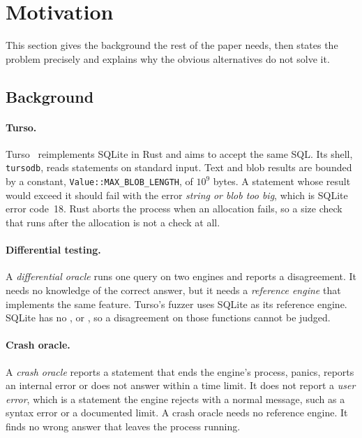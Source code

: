 \section{Motivation}
\label{sec:motivation}

This section gives the background the rest of the paper needs, then states the
problem precisely and explains why the obvious alternatives do not solve it.

\subsection{Background}
\label{sec:background}

\paragraph{Turso.} Turso~\cite{turso} reimplements SQLite in Rust and aims to
accept the same SQL. Its shell, \texttt{tursodb}, reads statements on standard
input. Text and blob results are bounded by a constant,
\texttt{Value::MAX\_BLOB\_LENGTH}, of $10^9$ bytes. A statement whose result
would exceed it should fail with the error \emph{string or blob too big}, which
is SQLite error code~18. Rust aborts the process when an allocation fails, so a
size check that runs after the allocation is not a check at all.

\paragraph{Differential testing.} A \emph{differential oracle} runs one query on
two engines and reports a disagreement. It needs no knowledge of the correct
answer, but it needs a \emph{reference engine} that implements the same feature.
Turso's fuzzer uses SQLite as its reference engine. SQLite has no ,
 or , so a disagreement on those functions cannot be
judged.

\paragraph{Crash oracle.} A \emph{crash oracle} reports a statement that ends the
engine's process, panics, reports an internal error or does not answer within a
time limit. It does not report a \emph{user error}, which is a statement the
engine rejects with a normal message, such as a syntax error or a documented
limit. A crash oracle needs no reference engine. It finds no wrong answer that
leaves the process running.

